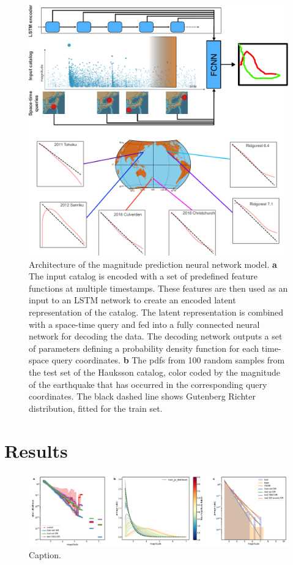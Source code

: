 \documentclass[pdflatex]{sn-jnl}
\begin{document}
\begin{figure}[h!]
	\centering
        \includegraphics[width=1\textwidth]{figures/intro_fig.pdf}
	\caption{
 Architecture of the magnitude prediction neural network model. \textbf{a} The input catalog is encoded with a set of predefined feature functions at multiple timestamps. These features are then used as an input to an LSTM network to create an encoded latent representation of the catalog. The latent representation is combined with a space-time query and fed into a fully connected neural network for decoding the data. The decoding network outputs a set of parameters defining a probability density function for each time-space query coordinates. \textbf{b} The pdfs from 100 random samples from the test set of the Hauksson catalog, color coded by the magnitude of the earthquake that has occurred in the corresponding query coordinates. The black dashed line shows Gutenberg Richter distribution, fitted for the train set.
}
\label{fig:architecture}
\end{figure}



\section{Results} \label{sec:results}

\begin{figure}[h!]
    \centering
    \includegraphics[width=1\textwidth]{figures/raw_results_hauksson.pdf}
    \caption{
        Caption.
    }
    \label{fig:architecture}
\end{figure}
\end{document}
